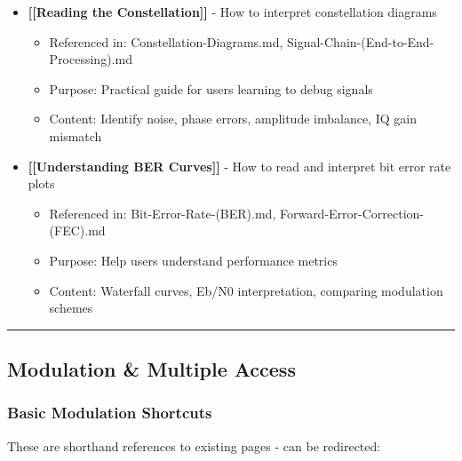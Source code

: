 \begin{itemize}
\tightlist
\item
  \textbf{{[}{[}Reading the Constellation{]}{]}} - How to interpret
  constellation diagrams

  \begin{itemize}
  \tightlist
  \item
    Referenced in: Constellation-Diagrams.md,
    Signal-Chain-(End-to-End-Processing).md
  \item
    Purpose: Practical guide for users learning to debug signals
  \item
    Content: Identify noise, phase errors, amplitude imbalance, IQ gain
    mismatch
  \end{itemize}
\item
  \textbf{{[}{[}Understanding BER Curves{]}{]}} - How to read and
  interpret bit error rate plots

  \begin{itemize}
  \tightlist
  \item
    Referenced in: Bit-Error-Rate-(BER).md,
    Forward-Error-Correction-(FEC).md
  \item
    Purpose: Help users understand performance metrics
  \item
    Content: Waterfall curves, Eb/N0 interpretation, comparing
    modulation schemes
  \end{itemize}
\end{itemize}

\begin{center}\rule{0.5\linewidth}{0.5pt}\end{center}

\subsection{\texorpdfstring{ Modulation \& Multiple
Access}{ Modulation \& Multiple Access}}\label{modulation-multiple-access}

\subsubsection{Basic Modulation
Shortcuts}\label{basic-modulation-shortcuts}

These are shorthand references to existing pages - can be redirected:

